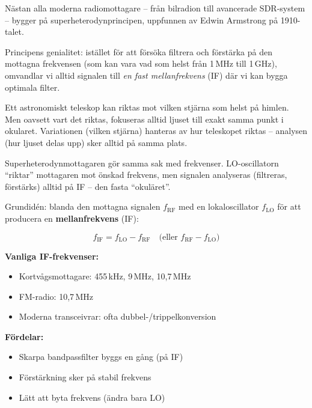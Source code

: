 \documentclass[a4paper,11pt,twoside]{book}
\newcommand{\emoji}[1]{{\emojifont #1}}
\begin{document}
Nästan alla moderna radiomottagare -- från bilradion till avancerade
SDR-system -- bygger på superheterodynprincipen, uppfunnen av
Edwin Armstrong på 1910-talet.

Principens genialitet: istället för att försöka filtrera och
förstärka på den mottagna frekvensen (som kan vara vad som helst
från 1\,MHz till 1\,GHz), omvandlar vi alltid signalen till
\emph{en fast mellanfrekvens} (IF) där vi kan bygga optimala filter.

\begin{storybox}[{\emoji{🔭} Teleskopet som vrider sig}]
Ett astronomiskt teleskop kan riktas mot vilken stjärna som helst
på himlen. Men oavsett vart det riktas, fokuseras alltid ljuset
till exakt samma punkt i okularet. Variationen (vilken stjärna)
hanteras av hur teleskopet riktas -- analysen (hur ljuset delas
upp) sker alltid på samma plats.

Superheterodynmottagaren gör samma sak med frekvenser. LO-oscillatorn
``riktar'' mottagaren mot önskad frekvens, men signalen analyseras
(filtreras, förstärks) alltid på IF -- den fasta ``okuläret''.
\end{storybox}

\begin{bluebox}[title={\emoji{🔑} Superheterodynprincipen}]
Grundidén: blanda den mottagna signalen $f_{\text{RF}}$ med en
lokaloscillator $f_{\text{LO}}$ för att producera en
\textbf{mellanfrekvens} (IF):

\[ f_{\text{IF}} = f_{\text{LO}} - f_{\text{RF}} \quad
   \text{(eller } f_{\text{RF}} - f_{\text{LO}}\text{)} \]

\medskip
\textbf{Vanliga IF-frekvenser:}
\begin{itemize}
  \item Kortvågsmottagare: 455\,kHz, 9\,MHz, 10,7\,MHz
  \item FM-radio: 10,7\,MHz
  \item Moderna transceivrar: ofta dubbel-/trippelkonversion
\end{itemize}

\medskip
\textbf{Fördelar:}
\begin{itemize}
  \item Skarpa bandpassfilter byggs en gång (på IF)
  \item Förstärkning sker på stabil frekvens
  \item Lätt att byta frekvens (ändra bara LO)
\end{itemize}
\end{bluebox}
\end{document}
